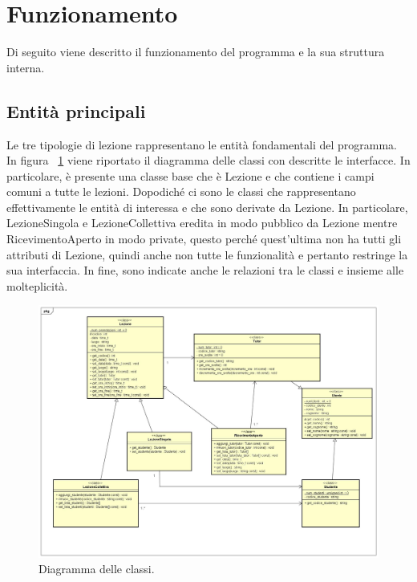 \section{Funzionamento}
Di seguito viene descritto il funzionamento del programma e la sua struttura interna.
\subsection{Entità principali}
Le tre tipologie di lezione rappresentano le entità fondamentali del programma. In figura \Fig~\ref{fig:ClassDiagram} viene riportato il diagramma delle classi con descritte le interfacce. In particolare, è presente una classe base che è Lezione e che contiene i campi comuni a tutte le lezioni. Dopodiché ci sono le classi che rappresentano effettivamente le entità di interessa e che sono derivate da Lezione. In particolare, LezioneSingola e LezioneCollettiva eredita in modo pubblico da Lezione mentre RicevimentoAperto in modo private, questo perché quest'ultima non ha tutti gli attributi di Lezione, quindi anche non tutte le funzionalità e pertanto restringe la sua interfaccia. In fine, sono indicate anche le relazioni tra le classi e insieme alle molteplicità.
\begin{figure}[ht]
	\centering
	\includegraphics[width=0.7\linewidth]{ImageFiles/c++/ClassDiagram}
	\caption{Diagramma delle classi.}
	\label{fig:ClassDiagram}
\end{figure}


